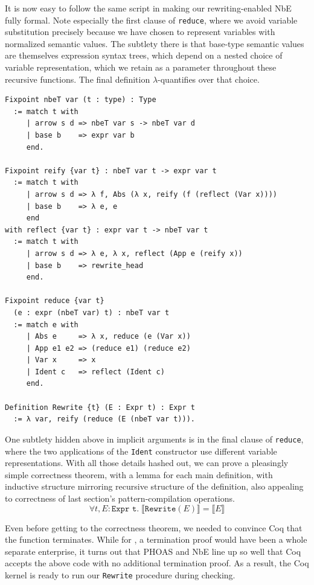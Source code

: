 It is now easy to follow the same script in making our rewriting-enabled NbE fully formal.
Note especially the first clause of \texttt{reduce}, where we avoid variable substitution precisely because we have chosen to represent variables with normalized semantic values.
The subtlety there is that base-type semantic values are themselves expression syntax trees, which depend on a nested choice of variable representation, which we retain as a parameter throughout these recursive functions.
The final definition $\lambda$-quantifies over that choice.
\begin{verbatim}
Fixpoint nbeT var (t : type) : Type
  := match t with
     | arrow s d => nbeT var s -> nbeT var d
     | base b    => expr var b
     end.

Fixpoint reify {var t} : nbeT var t -> expr var t
  := match t with
     | arrow s d => λ f, Abs (λ x, reify (f (reflect (Var x))))
     | base b    => λ e, e
     end
with reflect {var t} : expr var t -> nbeT var t
  := match t with
     | arrow s d => λ e, λ x, reflect (App e (reify x))
     | base b    => rewrite_head
     end.

Fixpoint reduce {var t}
  (e : expr (nbeT var) t) : nbeT var t
  := match e with
     | Abs e     => λ x, reduce (e (Var x))
     | App e1 e2 => (reduce e1) (reduce e2)
     | Var x     => x
     | Ident c   => reflect (Ident c)
     end.

Definition Rewrite {t} (E : Expr t) : Expr t
  := λ var, reify (reduce (E (nbeT var t))).
\end{verbatim}

One subtlety hidden above in implicit arguments is in the final clause of \texttt{reduce}, where the two applications of the \texttt{Ident} constructor use different variable representations.
With all those details hashed out, we can prove a pleasingly simple correctness theorem, with a lemma for each main definition, with inductive structure mirroring recursive structure of the definition, also appealing to correctness of last section's pattern-compilation operations.
$$\forall t, E : \texttt{Expr t}. \; \llbracket \texttt{Rewrite}(E) \rrbracket = \llbracket E \rrbracket$$

Even before getting to the correctness theorem, we needed to convince Coq that the function terminates.
While for \textcite{Aehlig}, a termination proof would have been a whole separate enterprise, it turns out that PHOAS and NbE line up so well that Coq accepts the above code with no additional termination proof.
As a result, the Coq kernel is ready to run our \texttt{Rewrite} procedure during checking.

